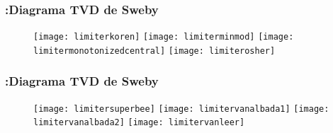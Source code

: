 \begin{frame}
	\frametitle{\secname :Diagrama TVD de Sweby}

	\begin{figure}[ht!]
		\centering
		\texttt{[image: limiterkoren]}
		\texttt{[image: limiterminmod]}
		\texttt{[image: limitermonotonizedcentral]}
		\texttt{[image: limiterosher]}
	\end{figure}
\end{frame}


\begin{frame}
	\frametitle{\secname :Diagrama TVD de Sweby}

	\begin{figure}[ht!]
		\centering
		\texttt{[image: limitersuperbee]}
		\texttt{[image: limitervanalbada1]}
		\texttt{[image: limitervanalbada2]}
		\texttt{[image: limitervanleer]}
	\end{figure}
\end{frame}
